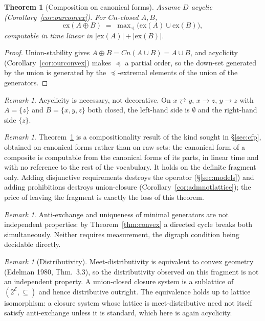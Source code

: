 \documentclass[11pt]{article}
\theoremstyle{definition}
\theoremstyle{plain}
\newtheorem{theorem}[definition]{Theorem}
\theoremstyle{remark}
\newtheorem{remark}[definition]{Remark}
\newcommand{\El}{\mathcal{E}}
\begin{document}
\begin{theorem}[Composition on canonical forms]\label{thm:excomp}
Assume $D$ acyclic (Corollary~\ref{cor:ourconvex}). For $Cn$-closed $A, B$,
\[
  \mathrm{ex}(A \oplus B) \;=\; \max\nolimits_{\preceq}\bigl(\mathrm{ex}(A) \cup \mathrm{ex}(B)\bigr),
\]
computable in time linear in $|\mathrm{ex}(A)| + |\mathrm{ex}(B)|$.
\end{theorem}

\begin{proof}
Union-stability gives $A \oplus B = Cn(A \cup B) = A \cup B$, and acyclicity
(Corollary~\ref{cor:ourconvex}) makes $\preceq$ a partial order, so the down-set
generated by the union is generated by the $\preceq$-extremal elements of the
union of the generators.
\end{proof}

\begin{remark}
Acyclicity is necessary, not decorative. On $x \rightleftarrows y$, $x \to z$,
$y \to z$ with $A = \{z\}$ and $B = \{x,y,z\}$ both closed, the left-hand side is
$\emptyset$ and the right-hand side $\{z\}$.
\end{remark}

\begin{remark}
Theorem~\ref{thm:excomp} is a compositionality result of the kind sought in
\S\ref{sec:cfp}, obtained on canonical forms rather than on raw sets: the
canonical form of a composite is computable from the canonical forms of its
parts, in linear time and with no reference to the rest of the vocabulary. It
holds on the definite fragment only. Adding disjunctive requirements destroys the
operator (\S\ref{sec:models}) and adding prohibitions destroys union-closure
(Corollary~\ref{cor:admnotlattice}); the price of leaving the fragment is exactly
the loss of this theorem.
\end{remark}

\begin{remark}
Anti-exchange and uniqueness of minimal generators are not independent
properties: by Theorem~\ref{thm:convex} a directed cycle breaks both
simultaneously. Neither requires measurement, the digraph condition being
decidable directly.
\end{remark}

\begin{remark}[Distributivity]
Meet-distributivity is equivalent to convex geometry (Edelman 1980, Thm.\ 3.3),
so the distributivity observed on this fragment is not an independent property.
A union-closed closure system is a sublattice of $(2^{\El}, \subseteq)$ and hence
distributive outright. The equivalence holds up to lattice isomorphism: a closure
system whose lattice is meet-distributive need not itself satisfy anti-exchange
unless it is standard, which here is again acyclicity.
\end{remark}
\end{document}
